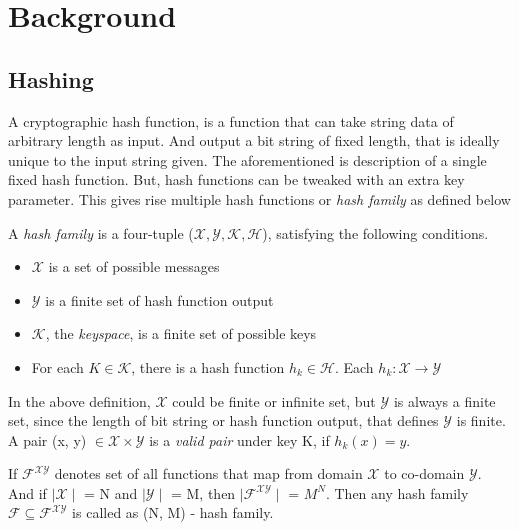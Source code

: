 \chapter{Background}

\section{Hashing}
A cryptographic hash function, is a function that can take string data of arbitrary length as input. 
And output a bit string of fixed length, that is ideally unique to the input string given. The 
aforementioned is description of a single fixed hash function. But, hash functions can be tweaked
with an extra key parameter. This gives rise multiple hash functions or \emph{hash family} as 
defined below \cite{00005}

\begin{center}
  \framebox
  {
    \parbox{420pt}
    {
      A \emph{hash family} is a four-tuple ($\mathcal{X}, \mathcal{Y}, \mathcal{K}, \mathcal{H}$),
      satisfying the following conditions.
      \begin{itemize}
        \item $\mathcal{X}$ is a set of possible messages
        \item $\mathcal{Y}$ is a finite set of hash function output
        \item $\mathcal{K}$, the \emph{keyspace}, is a finite set of possible keys
        \item For each $K \in \mathcal{K}$, there is a hash function $h_{k} \in \mathcal{H}$. Each 
          $h_{k}: \mathcal{X} \to \mathcal{Y}$ 
      \end{itemize}
    }
  }
\end{center}
\vspace{4mm}

In the above definition, $\mathcal{X}$ could be finite or infinite set, but $\mathcal{Y}$ is always
a finite set, since the length of bit string or hash function output, that defines $\mathcal{Y}$ is
finite. A pair (x, y) $\in \mathcal{X} \times \mathcal{Y}$ is a \emph{valid pair} under key K, if 
$h_{k}(x) = y$.

If $\mathcal{F}^{\mathcal{X}\mathcal{Y}}$ denotes set of all functions that map from domain $\mathcal{X}$
to co-domain $\mathcal{Y}$. And if $\mid\mathcal{X}\mid$ = N and $\mid\mathcal{Y}\mid$ = M, then 
$\mid\mathcal{F}^{\mathcal{XY}}\mid$ = $M^{N}$. Then any hash family $\mathcal{F} \subseteq \mathcal{F}^{\mathcal{XY}}$
is called as (N, M) - hash family.

